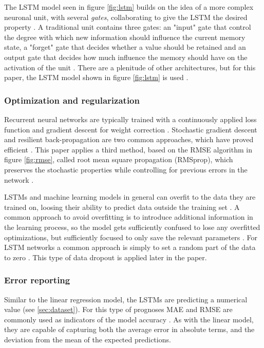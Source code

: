 \documentclass[a4paper]{article}
\begin{document}
The LSTM model seen in figure \ref{fig:lstm} builds on the idea of a more
complex neuronal unit, with several \textit{gates}, collaborating to give
the LSTM the desired property \citep{Gers2001}. A traditional unit contains
three gates: an "input" gate that control the degree with which new information
should influence the current memory state, a "forget" gate that decides whether
a value should be retained and an output gate that decides how much influence
the memory should have on the activation of the unit \citep{Hochreiter1997, Gers2001}.
There are a plenitude of other architectures, but for this paper, the LSTM
model shown in figure \ref{fig:lstm} is used \citep{Gers2001}.

\subsubsection{Optimization and regularization}
Recurrent neural networks are typically trained with a continuously applied
loss function and gradient descent for weight correction \citep{Russell2009,
Hochreiter1997, Schmidhuber2015}. Stochastic gradient descent and resilient
back-propagation are two common approaches, which have proved efficient
\citep{Russell2009, NILSSON2009}. This paper applies a third method, based on
the RMSE algorithm in figure \ref{fig:rmse}, called root mean square propagation
(RMSprop), which preserves the stochastic properties while controlling
for previous errors in the network \citep{Tieleman2012}.

LSTMs and machine learning models in general can overfit to the data
they are trained on, loosing their ability to predict data outside the training
set \citep{Russell2009, NILSSON2009}.
A common approach to avoid overfitting is to introduce additional
information in the learning process, so the model gets sufficiently confused
to lose any overfitted optimizations, but sufficiently focused to only save
the relevant parameters \citep{Schmidhuber2015, NILSSON2009}. For LSTM networks
a common approach is simply to set a random part of the data to zero
\citep{Schmidhuber2015}. This type of data dropout is applied later in the
paper.

\subsubsection{Error reporting}
Similar to the linear regression model, the LSTMs are predicting a numerical
value (see \ref{sec:dataset}). For this type of prognoses MAE and RMSE are
commonly used as indicators of the model accuracy
\citep{Russell2009, NILSSON2009, Schmidhuber2015}. As with the linear model,
they are capable of capturing both the average error in absolute terms,
and the deviation from the mean of the expected predictions.
\end{document}
